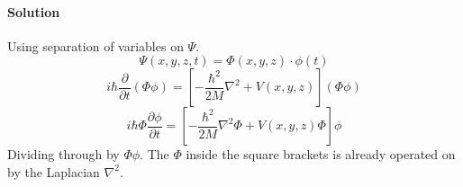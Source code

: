 \documentclass{article}
\begin{document}
{\begin{enumerate}
		\paragraph{Solution} Using separation of variables on $\Psi$.
		\[
			\Psi(x, y, z, t) = \Phi(x, y, z) \cdot \phi(t)
		\]
		\[
			i\hbar \frac{\partial}{\partial t} \left( \Phi \phi \right) = \left[ -\frac{\hbar^2}{2M} \nabla^2 + V(x, y, z) \right] \left( \Phi \phi \right)
		\]
		\[
			i\hbar \Phi \frac{\partial \phi}{\partial t} = \left[ -\frac{\hbar^2}{2M} \nabla^2 \Phi + V(x, y, z) \Phi \right] \phi
		\]
		Dividing through by $\Phi \phi$. The $\Phi$ inside the square brackets is already operated on by the Laplacian $\nabla^2$.

\end{enumerate}}
\end{document}
